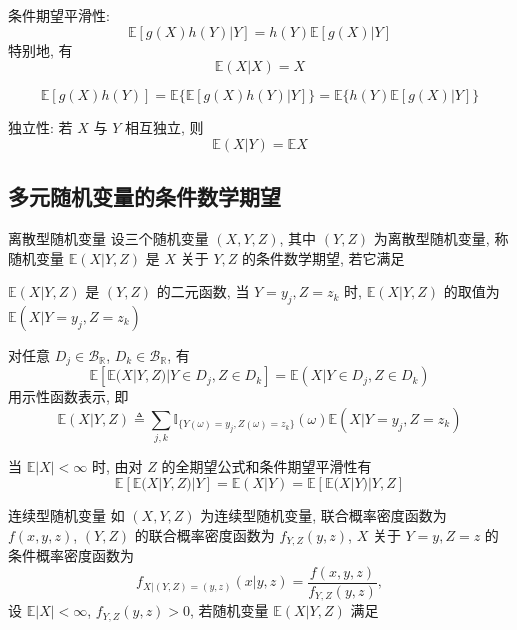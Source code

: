 \documentclass[openany]{ctexbook}
\theoremstyle{kaiti}
\theoremstyle{normal}
\begin{document}
条件期望平滑性:
\begin{equation}
  \mathbb{E}[g(X)h(Y)|Y]=h(Y)\mathbb{E}[g(X)|Y]
\end{equation}
 特别地, 有
\begin{equation}
  \mathbb{E}(X|X)=X
\end{equation}

\begin{equation}
  \mathbb{E}[g(X)h(Y)]=\mathbb{E}\{\mathbb{E}[g(X)h(Y)|Y]\}=\mathbb{E}\{h(Y)\mathbb{E}[g(X)|Y]\}
\end{equation}


独立性: 若 $X$ 与 $Y$ 相互独立, 则
\begin{equation}
  \mathbb{E}(X|Y)=\mathbb{E}X
\end{equation}


\subsection{多元随机变量的条件数学期望}

离散型随机变量
设三个随机变量 $(X,Y,Z)$, 其中 $(Y,Z)$ 为离散型随机变量, 称随机变量 $\mathbb{E}(X|Y,Z)$ 是 $X$ 关于 $Y,Z$ 的条件数学期望, 若它满足

 $\mathbb{E}(X|Y,Z)$ 是 $(Y,Z)$ 的二元函数, 当 $Y=y_j,Z=z_k$ 时, $\mathbb{E}(X|Y,Z)$ 的取值为 $\mathbb{E}(X|Y=y_j,Z=z_k)$

 对任意 $D_j\in\mathcal{B}_{\mathbb{R}}$, $D_k\in\mathcal{B}_{\mathbb{R}}$, 有
\begin{equation}
  \mathbb{E}[\mathbb{E}(X|Y,Z)|Y\in D_j,Z\in D_k]=\mathbb{E}(X|Y\in D_j,Z\in D_k)
\end{equation}
 用示性函数表示, 即
\begin{equation}
  \mathbb{E}(X|Y,Z)\triangleq\sum_{j,k}\mathbb{I}_{\{Y(\omega)=y_j,Z(\omega)=z_k\}}(\omega)\mathbb{E}(X|Y=y_j,Z=z_k)
\end{equation}


当 $\mathbb{E}|X|<\infty$ 时, 由对 $Z$ 的全期望公式和条件期望平滑性有 
\begin{equation}
  \mathbb{E}[\mathbb{E}(X|Y,Z)|Y]=\mathbb{E}(X|Y)=\mathbb{E}[\mathbb{E}(X|Y)|Y,Z]
\end{equation}

连续型随机变量
如 $(X,Y,Z)$ 为连续型随机变量, 联合概率密度函数为 $f(x,y,z)$, $(Y,Z)$ 的联合概率密度函数为 $f_{Y,Z}(y,z)$, $X$ 关于 $Y=y,Z=z$ 的条件概率密度函数为
\begin{equation}
  f_{X|(Y,Z)=(y,z)}(x|y,z)=\frac{f(x,y,z)}{f_{Y,Z}(y,z)},
\end{equation} 设 $\mathbb{E}|X|<\infty$, $f_{Y,Z}(y,z)>0$, 若随机变量 $\mathbb{E}(X|Y,Z)$ 满足
\end{document}
